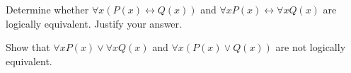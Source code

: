 \documentclass{exam}
\begin{document}
\begin{questions}


\question Determine whether \(\forall x(P(x) \leftrightarrow Q(x))\) and \(\forall x P(x) \leftrightarrow \forall x Q(x)\) are logically equivalent. Justify your answer.
\vspace{9in}

\question Show that \(\forall x P(x) \lor \forall x Q(x)\) and \(\forall x (P(x) \lor Q(x))\) are not logically equivalent.

\vspace{9in}


\end{questions}
\end{document}

